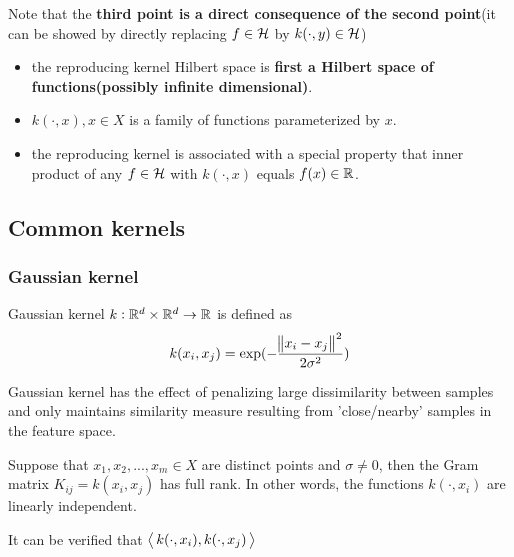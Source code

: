 \begin{refsection}
\begin{remark}
	Note that the \textbf{third point is a direct consequence of the second point}(it can be showed by directly replacing $f\in \mathcal{H}$ by $k(\cdot,y) \in \mathcal{H}$)
\end{remark}



\begin{remark}
	\begin{itemize}
		\item the reproducing kernel Hilbert space is \textbf{first a Hilbert space of functions(possibly infinite dimensional)}.
		\item $k(\cdot,x),x\in X$ is a family of functions parameterized by $x$.
		\item the reproducing kernel is associated with a special property that inner product of any $f\in \mathcal{H}$ with $k(\cdot,x)$ equals $f(x) \in \mathbb{R}$. 
	\end{itemize}
\end{remark}


\subsection{Common kernels}
\subsubsection{Gaussian kernel}
\begin{definition}
	\cite[482]{murphy2012machine}Gaussian kernel $k:\mathbb{R}^d\times \mathbb{R}^d \to \mathbb{R}$ is defined as
	$$k(x_i,x_j) = \exp(-\frac{\norm{x_i-x_j}^2}{2\sigma^2})$$
\end{definition}


\begin{remark}
	Gaussian kernel has the effect of penalizing large dissimilarity between samples and only maintains similarity measure resulting from 'close/nearby' samples in the feature space. 
\end{remark}


\begin{lemma}
	\cite[47]{scholkopf2002learning}Suppose that $x_1,x_2,...,x_m \in X$ are distinct points and $\sigma \neq 0$, then the Gram matrix $K_{ij} = k(x_i,x_j)$ has full rank.
	In other words, the functions $k(\cdot,x_i)$ are linearly independent.
\end{lemma}

\begin{remark}
	It can be verified that ${\left< \, k(\cdot,x_i),k(\cdot,x_j) \, \right>}$
\end{remark}


\end{refsection}
